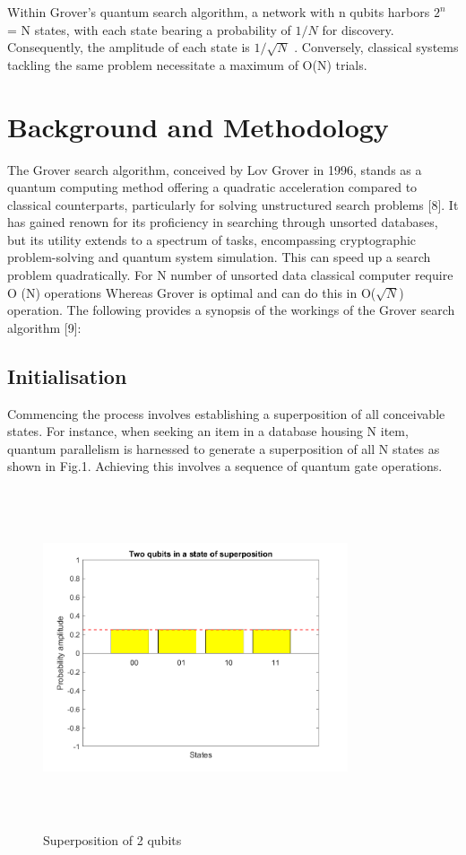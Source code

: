 \documentclass[conference]{IEEEtran}
\begin{document}
Within Grover’s quantum search algorithm, a network with
n qubits harbors $ 2^{n} $ = N states, with each state bearing a
probability of $ 1/N $ for discovery. Consequently, the amplitude
of each state is $ 1/\sqrt{N} $
. Conversely, classical systems tackling the
same problem necessitate a maximum of O(N) trials.
\section{Background and Methodology}

The Grover search algorithm, conceived by Lov Grover
in 1996, stands as a quantum computing method offering
a quadratic acceleration compared to classical counterparts,
particularly for solving unstructured search problems [8]. It
has gained renown for its proficiency in searching through
unsorted databases, but its utility extends to a spectrum
of tasks, encompassing cryptographic problem-solving and
quantum system simulation. This can speed up a search
problem quadratically. For N number of unsorted data classical
computer require O (N) operations Whereas Grover is optimal
and can do this in O($ \sqrt{N} $) operation. The following provides
a synopsis of the workings of the Grover search algorithm [9]:
\subsection{Initialisation}
Commencing the process involves establishing a superposition of all conceivable states. For instance, when seeking an
item in a database housing N item, quantum parallelism is
harnessed to generate a superposition of all N states as shown
in Fig.1. Achieving this involves a sequence of quantum gate
operations.

\begin{figure}[htbp]
	\centerline{\includegraphics[width=9cm,height=10cm,keepaspectratio]{fig1.png}}
	\caption{Superposition of 2 qubits}
	\label{fig}
\end{figure}
\end{document}
